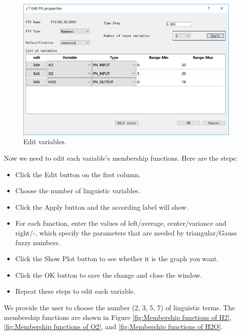 \documentclass[journal,a4paper,onecolumn]{article}
\begin{document}
\begin{figure}[!hbt]
	\begin{center}
		\includegraphics[width=\columnwidth]{fig8}
		\caption{Edit variables.}
		\label{fig:Edit variables}
	\end{center}
\end{figure}

Now we need to edit each variable's membership functions. Here are the steps:
\begin{itemize}
	\item Click the Edit button on the first column.
	\item Choose the number of linguistic variables.
	\item Click the Apply button and the according label will show.
	\item For each function, enter the values of left/average, center/variance and right/-, which specify the parameters that are needed by triangular/Gauss fuzzy numbers.
	\item Click the Show Plot button to see whether it is the graph you want.
	\item Click the OK button to save the change and close the window.
	\item Repeat these steps to edit each variable.
\end{itemize}

We provide the user to choose the number (2, 3, 5, 7) of linguistic terms. The membership functions are shown in Figure \ref{fig:Membership functions of H2}, \ref{fig:Membership functions of O2}, and \ref{fig:Membership functions of H2O}.
\end{document}
